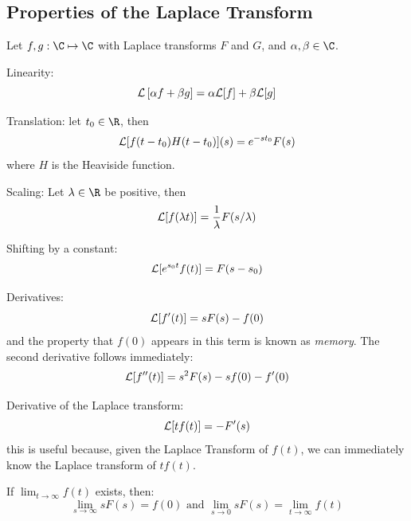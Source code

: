 \documentclass[../Main.tex]{subfiles}
\begin{document}
\subsection{Properties of the Laplace Transform}
\begin{propositions}{
        Let $f, g : \C \mapsto \C$ with Laplace transforms $F$ and $G$, and $\alpha, \beta \in \C$.
        \label{propsLTProps}
    }
    \item Linearity:
        \begin{equation*}
            \mathcal{L}\left[\alpha f + \beta g\right] = \alpha \mathcal{L}[f] + \beta \mathcal{L}[g]
        \end{equation*}
    \item Translation: let $t_0 \in \R$, then
        \begin{equation*}
            \mathcal{L}[f(t - t_0) H(t - t_0)] (s) = e^{-s t_0} F(s)
        \end{equation*}
        where $H$ is the Heaviside function.
    \item Scaling: Let $\lambda \in \R$ be positive, then
        \begin{equation*}
            \mathcal{L}[f(\lambda t)] = \frac{1}{\lambda} F(s / \lambda)
        \end{equation*}
    \item Shifting by a constant:
        \begin{equation*}
            \mathcal{L}[e^{s_0 t} f(t)] = F(s - s_0)
        \end{equation*}
    \item Derivatives:
        \begin{equation*}
            \mathcal{L}[f'(t)] = sF(s) - f(0)
        \end{equation*}
        and the property that $f(0)$ appears in this term is known as \textit{memory}. The second derivative follows immediately:
        \begin{equation*}
            \mathcal{L}[f''(t)] = s^2 F(s) - sf(0) - f'(0)
        \end{equation*}
    \item Derivative of the Laplace transform:
        \begin{equation*}
            \mathcal{L}[tf(t)] = -F'(s)
        \end{equation*}
        this is useful because, given the Laplace Transform of $f(t)$, we can immediately know the Laplace transform of $tf(t)$.
    \item If $\lim_{t \to\infty} f(t)$ exists, then:
        \begin{equation*}
            \lim_{s \to \infty} sF(s) = f(0) \text{ and } \lim_{s \to 0} sF(s) = \lim_{t \to \infty}f(t)
        \end{equation*}
\end{propositions}
\end{document}
